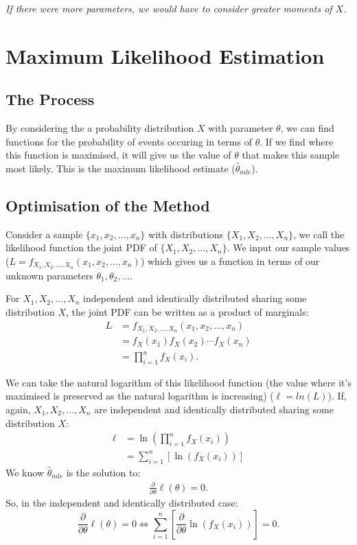 \documentclass[a4paper, 12pt, twoside]{article}
\begin{document}
\textit{If there were more parameters, we would have to consider
    greater moments of $X$.}

\section{Maximum Likelihood Estimation}

\subsection{The Process}

By considering the a probability distribution $X$ with parameter $\theta$,
we can find functions for the probability of events occuring in terms
of $\theta$. If we find where this function is maximised, it will give us
the value of $\theta$ that makes this sample most likely. This is the
maximum likelihood estimate ($\hat\theta_{mle}$).

\subsection{Optimisation of the Method}

Consider a sample $\{x_1, x_2, \ldots, x_n\}$ with distributions
$\{X_1, X_2, \ldots, X_n\}$, we call the likelihood function the
joint PDF of $\{X_1, X_2, \ldots, X_n\}$. We input our sample values
($L = f_{X_1, X_2, \ldots, X_n}(x_1, x_2, \ldots, x_n)$) which gives us
a function in terms of our unknown parameters $\theta_1, \theta_2, \ldots$.

\vspace{\baselineskip}

For $X_1, X_2, \ldots, X_n$ independent and identically distributed
sharing some distribution $X$, the joint PDF can be written as a
product of marginals:
\begin{align*}
    L & = f_{X_1, X_2, \ldots, X_n}(x_1, x_2, \ldots, x_n) \\
      & = f_X(x_1)f_X(x_2)\cdots f_X(x_n)                  \\
      & = \prod_{i = 1}^n f_X(x_i).
\end{align*}

We can take the natural logarithm of this likelihood function (the value
where it's maximised is preserved as the natural logarithm is increasing)
($\ell = ln(L)$). If, again, $X_1, X_2, \ldots, X_n$ are independent
and identically distributed sharing some distribution $X$:
\begin{align*}
    \ell & = \ln{\left(\prod_{i = 1}^n f_X(x_i)\right)} \\
         & = \sum_{i = 1}^n\left[\ln{(f_X(x_i))}\right]
\end{align*}
We know $\hat\theta_{mle}$ is the solution to:
\begin{align*}
    \frac{\partial}{\partial\theta}\ell(\theta) = 0.
\end{align*}
So, in the independent and identically distributed case:
\begin{equation*}
    \frac{\partial}{\partial\theta}\ell(\theta) = 0
    \Longleftrightarrow
    \sum_{i = 1}^n\left[\frac{\partial}{\partial\theta}\ln{(f_X(x_i))}\right]
    = 0.
\end{equation*}
\end{document}
